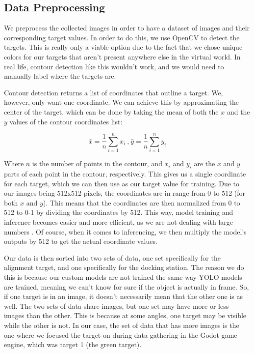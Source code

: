 \subsection{Data Preprocessing}
We preprocess the collected images in order to have a dataset of images and their corresponding target values. In order to do this, we use OpenCV to detect the targets. This is really only a viable option due to the fact that we chose unique colors for our targets that aren't present anywhere else in the virtual world. In real life, contour detection like this wouldn't work, and we would need to manually label where the targets are.

Contour detection returns a list of coordinates that outline a target. We, however, only want one coordinate. We can achieve this by approximating the center of the target, which can be done by taking the mean of both the \(x\) and the \(y\) values of the contour coordinates list:

\[
	\bar{x} = \frac{1}{n}\sum_{i=1}^{n} x_i ~\text{,} ~\bar{y} = \frac{1}{n}\sum_{i=1}^{n} y_i
\]


Where \(n\) is the number of points in the contour, and \(x_i\) and \(y_i\) are the \(x\) and \(y\) parts of each point in the contour, respectively. This gives us a single coordinate for each target, which we can then use as our target value for training. Due to our images being 512x512 pixels, the coordinates are in range from 0 to 512 (for both \(x\) and \(y\)). This means that the coordinates are then normalized from 0 to 512 to 0-1 by dividing the coordinates by 512. This way, model training and inference becomes easier and more efficient, as we are not dealing with large numbers \citep{SINGH2020105524}. Of course, when it comes to inferencing, we then multiply the model's outputs by 512 to get the actual coordinate values.

Our data is then sorted into two sets of data, one set specifically for the alignment target, and one specifically for the docking station. The reason we do this is because our custom models are not trained the same way YOLO models are trained, meaning we can't know for sure if the object is actually in frame. So, if one target is in an image, it doesn't necessarily mean that the other one is as well. The two sets of data share images, but one set may have more or less images than the other. This is because at some angles, one target may be visible while the other is not. In our case, the set of data that has more images is the one where we focused the target on during data gathering in the Godot game engine, which was target 1 (the green target).

